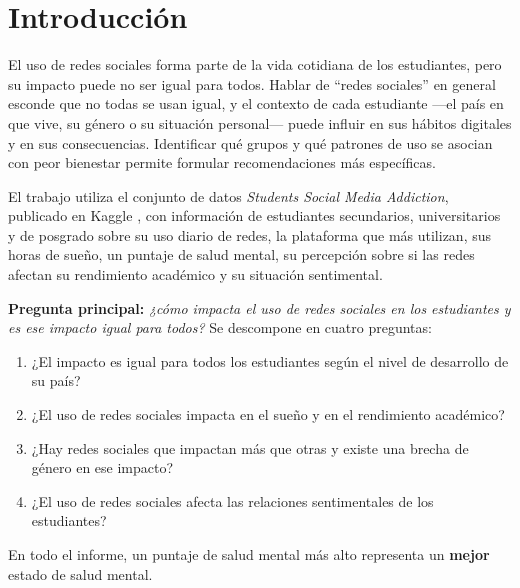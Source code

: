 \section{Introducción}

El uso de redes sociales forma parte de la vida cotidiana de los estudiantes, pero su impacto puede no ser
igual para todos. Hablar de “redes sociales” en general esconde que no todas se usan igual, y el contexto de
cada estudiante —el país en que vive, su género o su situación personal— puede influir en sus hábitos
digitales y en sus consecuencias. Identificar qué grupos y qué patrones de uso se asocian con peor
bienestar permite formular recomendaciones más específicas.

El trabajo utiliza el conjunto de datos \textit{Students Social Media Addiction}, publicado en Kaggle
\cite{kaggle}, con información de estudiantes secundarios, universitarios y de posgrado sobre su uso diario
de redes, la plataforma que más utilizan, sus horas de sueño, un puntaje de salud mental, su percepción
sobre si las redes afectan su rendimiento académico y su situación sentimental.

\begin{hallazgo}
\textbf{Pregunta principal:} \textit{¿cómo impacta el uso de redes sociales en los estudiantes y es ese
impacto igual para todos?} Se descompone en cuatro preguntas:
\begin{enumerate}[label=\arabic*.,itemsep=0pt,topsep=2pt]
  \item ¿El impacto es igual para todos los estudiantes según el nivel de desarrollo de su país?
  \item ¿El uso de redes sociales impacta en el sueño y en el rendimiento académico?
  \item ¿Hay redes sociales que impactan más que otras y existe una brecha de género en ese impacto?
  \item ¿El uso de redes sociales afecta las relaciones sentimentales de los estudiantes?
\end{enumerate}
\end{hallazgo}

En todo el informe, un puntaje de salud mental más alto representa un \textbf{mejor} estado de salud mental.
